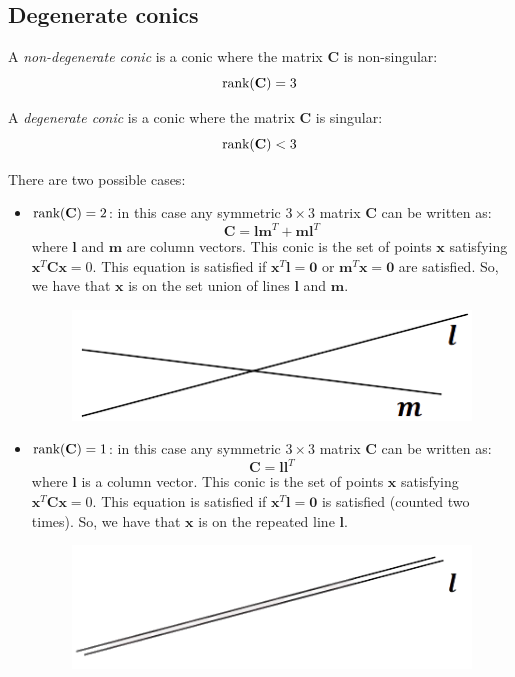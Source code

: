\documentclass[12pt, a4paper]{report}
\newtheorem[style=M,bodystyle=\normalfont]{theorem}{Theorem}
\newtheorem[style=M,bodystyle=\normalfont]{corollary}{Corollary}
\newtheorem[style=M,bodystyle=\normalfont]{lemma}{Lemma}
\newtheorem[style=M,bodystyle=\normalfont]{definition}{Definition}
\begin{document}
    \subsection{Degenerate conics}
    \begin{definition}
        A \emph{non-degenerate conic} is a conic where the matrix $\textbf{C}$ is non-singular: 
        \[\textnormal{rank}(\textbf{C})=3\]

        A \emph{degenerate conic} is a conic where the matrix $\textbf{C}$ is singular: 
        \[\textnormal{rank}(\textbf{C}) < 3\]
    \end{definition}
    There are two possible cases: 
    \begin{itemize}
        \item $\textnormal{rank}(\textbf{C}) = 2$: in this case any symmetric $3 \times 3$ matrix $\textbf{C}$ can be written as:
            \[\textbf{C}=\textbf{lm}^T+\textbf{ml}^T\]
            where $\textbf{l}$ and $\textbf{m}$ are column vectors. This conic is the set of points $\textbf{x}$ satisfying $\textbf{x}^T\textbf{C}\textbf{x}=0$. This equation is 
            satisfied if $\textbf{x}^T\textbf{l}=\textbf{0}$ or $\textbf{m}^T\textbf{x}=\textbf{0}$ are satisfied. So, we have that $\textbf{x}$ is on the set union of lines 
            $\textbf{l}$ and $\textbf{m}$.
            \begin{figure}[H]
                \centering
                \includegraphics[width=0.5\linewidth]{images/inters.png}
            \end{figure}
        \item $\textnormal{rank}(\textbf{C}) = 1$: in this case any symmetric $3 \times 3$ matrix $\textbf{C}$ can be written as:
            \[\textbf{C}=\textbf{ll}^T\]
            where $\textbf{l}$ is a column vector. This conic is the set of points $\textbf{x}$ satisfying $\textbf{x}^T\textbf{C}\textbf{x}=0$. This equation is 
            satisfied if $\textbf{x}^T\textbf{l}=\textbf{0}$ is satisfied (counted two times). So, we have that $\textbf{x}$ is on the repeated line $\textbf{l}$. 
            \begin{figure}[H]
                \centering
                \includegraphics[width=0.5\linewidth]{images/rep.png}
            \end{figure}
    \end{itemize}
\end{document}
